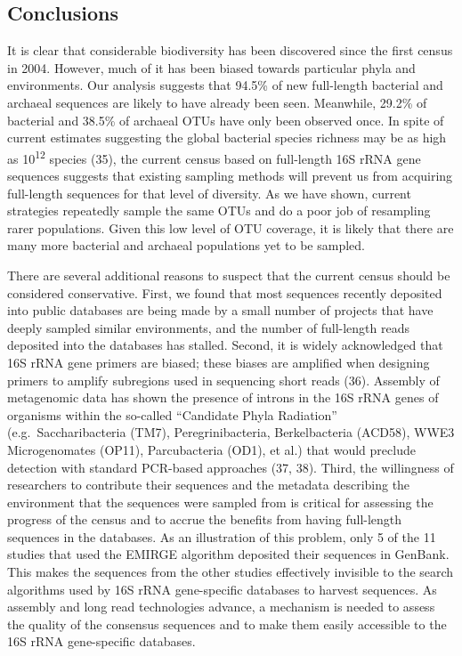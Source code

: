 \documentclass[11pt,]{article}
\begin{document}
\subsection{Conclusions}\label{conclusions}

It is clear that considerable biodiversity has been discovered since the
first census in 2004. However, much of it has been biased towards
particular phyla and environments. Our analysis suggests that 94.5\% of
new full-length bacterial and archaeal sequences are likely to have
already been seen. Meanwhile, 29.2\% of bacterial and 38.5\% of archaeal
OTUs have only been observed once. In spite of current estimates
suggesting the global bacterial species richness may be as high as
10\textsuperscript{12} species (35), the current census based on
full-length 16S rRNA gene sequences suggests that existing sampling
methods will prevent us from acquiring full-length sequences for that
level of diversity. As we have shown, current strategies repeatedly
sample the same OTUs and do a poor job of resampling rarer populations.
Given this low level of OTU coverage, it is likely that there are many
more bacterial and archaeal populations yet to be sampled.

There are several additional reasons to suspect that the current census
should be considered conservative. First, we found that most sequences
recently deposited into public databases are being made by a small
number of projects that have deeply sampled similar environments, and
the number of full-length reads deposited into the databases has
stalled. Second, it is widely acknowledged that 16S rRNA gene primers
are biased; these biases are amplified when designing primers to amplify
subregions used in sequencing short reads (36). Assembly of metagenomic
data has shown the presence of introns in the 16S rRNA genes of
organisms within the so-called ``Candidate Phyla Radiation''
(e.g.~Saccharibacteria (TM7), Peregrinibacteria, Berkelbacteria (ACD58),
WWE3 Microgenomates (OP11), Parcubacteria (OD1), et al.) that would
preclude detection with standard PCR-based approaches (37, 38). Third,
the willingness of researchers to contribute their sequences and the
metadata describing the environment that the sequences were sampled from
is critical for assessing the progress of the census and to accrue the
benefits from having full-length sequences in the databases. As an
illustration of this problem, only 5 of the 11 studies that used the
EMIRGE algorithm deposited their sequences in GenBank. This makes the
sequences from the other studies effectively invisible to the search
algorithms used by 16S rRNA gene-specific databases to harvest
sequences. As assembly and long read technologies advance, a mechanism
is needed to assess the quality of the consensus sequences and to make
them easily accessible to the 16S rRNA gene-specific databases.
\end{document}
